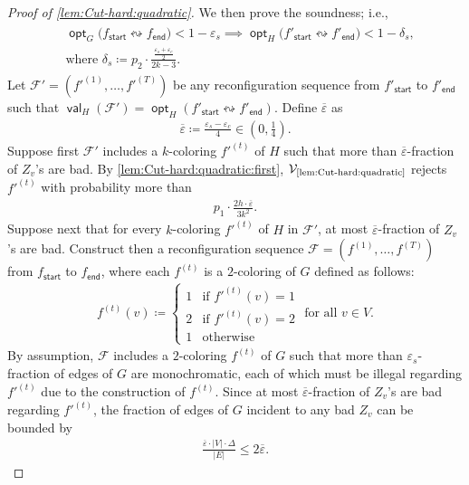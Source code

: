 \documentclass[11pt,fleqn]{article}
\renewcommand{\leq}{\leqslant}
\renewcommand{\epsilon}{\varepsilon}
\renewcommand{\bar}{\overline}
\newcommand{\reco}{\leftrightsquigarrow}
\newcommand{\defeq}{\coloneq}
\DeclareMathOperator{\val}{\mathsf{val}}
\DeclareMathOperator{\opt}{\mathsf{opt}}
\newcommand{\sss}{\mathsf{start}}
\newcommand{\ttt}{\mathsf{end}}
\newcommand{\V}{\calV}
\newcommand{\f}{f}
\newcommand{\sqcol}{\scrF}
\newcommand{\Vquad}{\V_{\text{\ref{lem:Cut-hard:quadratic}}}}
\newcommand{\calV}{\mathcal{V}}
\newcommand{\scrF}{\mathscr{F}}
\theoremstyle{definition}
\numberwithin{equation}{section}
\begin{document}
\begin{proof}[Proof of \cref{lem:Cut-hard:quadratic}]
We then prove the soundness; i.e.,
\begin{align}
\begin{aligned}
    & \opt_G\bigl(\f_\sss \reco \f_\ttt\bigr) < 1-\epsilon_s \implies
    \opt_H\bigl(\f'_\sss \reco \f'_\ttt\bigr) < 1 - \delta_s, \\
    & \text{where } \delta_s \defeq p_2 \cdot \frac{\frac{\epsilon_s + \epsilon_c}{2}}{2k-3}.
\end{aligned}
\end{align}
Let $\sqcol' = (\f'^{(1)}, \ldots, \f'^{(T)})$ be any reconfiguration sequence
from $\f'_\sss$ to $\f'_\ttt$ such that
$\val_H(\sqcol') = \opt_H(\f'_\sss \reco \f'_\ttt)$.
Define $\bar{\epsilon}$ as
\begin{align}
    \bar{\epsilon} \defeq \frac{\epsilon_s - \epsilon_c}{4} \in \left(0,\tfrac{1}{4}\right).
\end{align}
Suppose first $\sqcol'$ includes a $k$-coloring $\f'^{(t)}$ of $H$ such that
more than $\bar{\epsilon}$-fraction of $Z_v$'s are bad.
By \cref{lem:Cut-hard:quadratic:first},
$\Vquad$ rejects $\f'^{(t)}$ with probability more than
\begin{align}
    p_1 \cdot \frac{2h \cdot \bar{\epsilon}}{3k^2}.
\end{align}
Suppose next that
for every $k$-coloring $\f'^{(t)}$ of $H$ in $\sqcol'$,
at most $\bar{\epsilon}$-fraction of $Z_v$'s are bad.
Construct then a reconfiguration sequence $\sqcol = (\f^{(1)}, \ldots, \f^{(T)})$
from $\f_\sss$ to $\f_\ttt$, where
each $\f^{(t)}$ is a $2$-coloring of $G$ defined as follows: 
\begin{align}
    \f^{(t)}(v) \defeq
    \begin{cases}
        1 & \text{if } \f'^{(t)}(v) = 1 \\
        2 & \text{if } \f'^{(t)}(v) = 2 \\
        1 & \text{otherwise}
    \end{cases}
    \text{ for all } v \in V.
\end{align}
By assumption,
$\sqcol$ includes a $2$-coloring $\f^{(t)}$ of $G$ such that
more than $\epsilon_s$-fraction of edges of $G$ are monochromatic,
each of which must be illegal regarding $\f'^{(t)}$ due to the construction of $\f^{(t)}$.
Since at most $\bar{\epsilon}$-fraction of $Z_v$'s are bad regarding $\f'^{(t)}$,
the fraction of edges of $G$ incident to any bad $Z_v$ can be bounded by
\begin{align}
    \frac{\bar{\epsilon} \cdot |V|\cdot \Delta}{|E|} \leq 2 \bar{\epsilon}.
\end{align}

\end{proof}
\end{document}
